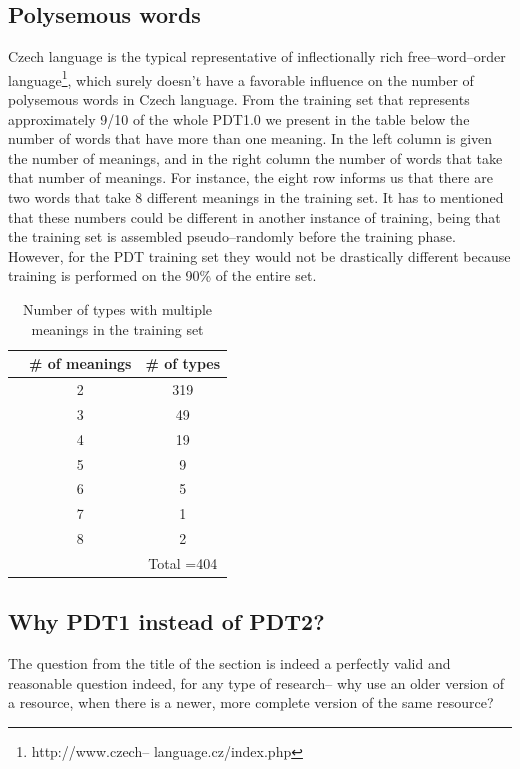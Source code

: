 \subsection{Polysemous words}\label{pdt}
Czech language is the typical representative of inflectionally rich free--word--order language\footnote{http://www.czech--
language.cz/index.php}, which surely doesn't have a favorable influence on the number of polysemous words in Czech 
language. From the training set that represents approximately 9/10 of the whole PDT1.0 we present in the table below the 
number of words that have more than one meaning. In the left column is given the number of meanings, and in the right column 
the number of words that take that number of meanings. For instance, the eight row informs us that there are two words that 
take 8 different meanings in the training set. It has to mentioned that these numbers could be different in another instance of 
training, being that the training set is assembled pseudo--randomly before the training phase. However, for the PDT training set they would not be drastically different because training is performed on the 90\% of the entire set. 
\begin{table}[h!]
\begin{center}
	\begin{tabular}{ c  c |  c }
   	&   \# of meanings & \# of types \\
\hline  
 & 2 & 319  \\
 & 3 & 49  \\
 & 4 & 19  \\
 & 5 & 9  \\
 & 6 & 5  \\
 & 7 & 1  \\
 & 8 & 2  \\
\hline  
& &Total =404\\  
 	\end{tabular}
\end{center}
\caption{Number of types with multiple meanings in the training set}
\end{table}



\subsection{Why PDT1 instead of PDT2?}
The question from the title of the section is indeed a perfectly valid and reasonable question indeed, for 
any type of research-- why use an older version of a resource, when there is a newer, more complete 
version of the same resource?  

